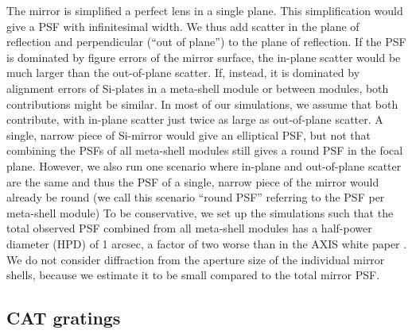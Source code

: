 \documentclass[12pt]{spieman}  %
\begin{document}
\begin{spacing}{1}
The mirror is simplified a perfect lens in a single plane. This simplification would give a PSF with infinitesimal width. We thus add scatter in the plane of reflection and perpendicular (``out of plane'') to the plane of reflection. If the PSF is dominated by figure errors of the mirror surface, the in-plane scatter would be much larger than the out-of-plane scatter. If, instead, it is dominated by alignment errors of Si-plates in a meta-shell module or between modules, both contributions might be similar. In most of our simulations, we assume that both contribute, with in-plane scatter just twice as large as out-of-plane scatter. A single, narrow piece of Si-mirror would give an elliptical PSF, but not that combining the PSFs of all meta-shell modules still gives a round PSF in the focal plane.
However, we also run one scenario where in-plane and out-of-plane scatter are the same and thus the PSF of a single, narrow piece of the mirror would already be round (we call this scenario ``round PSF'' referring to the PSF per meta-shell module)
To be conservative, we set up the simulations such that the total observed PSF combined from all meta-shell modules has a half-power diameter (HPD) of 1 arcsec, a factor of two worse than in the AXIS white paper \cite{2019BAAS...51g.107M}.
We do not consider diffraction from the aperture size of the individual mirror shells, because we estimate it to be small compared to the total mirror PSF\cite{Chalifoux,Raimondi}.


\subsection{CAT gratings}


\end{spacing}
\end{document}
